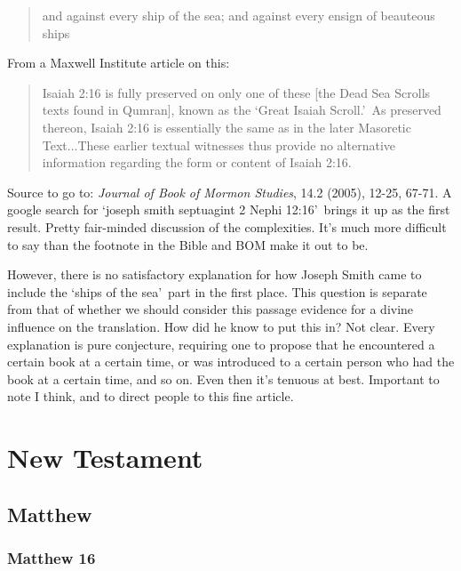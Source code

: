 \begin{compactdesc}
\begin{compactdesc}
			\begin{quote}
			and against every ship of the sea; and against every ensign of beauteous ships
			\end{quote}

			From a Maxwell Institute article on this:

			\begin{quote}
			Isaiah 2:16 is fully preserved on only one of these [the Dead Sea Scrolls texts found in Qumran], known as the \lq Great Isaiah Scroll.\rq \ As preserved thereon, Isaiah 2:16 is essentially the same as in the later Masoretic Text...These earlier textual witnesses thus provide no alternative information regarding the form or content of Isaiah 2:16.
			\end{quote}

			Source to go to: \textit{Journal of Book of Mormon Studies}, 14.2 (2005), 12-25, 67-71. A google search for \lq joseph smith septuagint 2 Nephi 12:16\rq \ brings it up as the first result. Pretty fair-minded discussion of the complexities. It's much more difficult to say than the footnote in the Bible and BOM make it out to be.

			However, there is no satisfactory explanation for how Joseph Smith came to include the \lq ships of the sea\rq \ part in the first place. This question is separate from that of whether we should consider this passage evidence for a divine influence on the translation. How did he know to put this in? Not clear. Every explanation is pure conjecture, requiring one to propose that he encountered a certain book at a certain time, or was introduced to a certain person who had the book at a certain time, and so on. Even then it's tenuous at best. Important to note I think, and to direct people to this fine article.
		\end{compactdesc}
		
		\end{compactdesc}

\section{New Testament} %

\subsection{Matthew} %

	\subsubsection{Matthew 16} %
	
